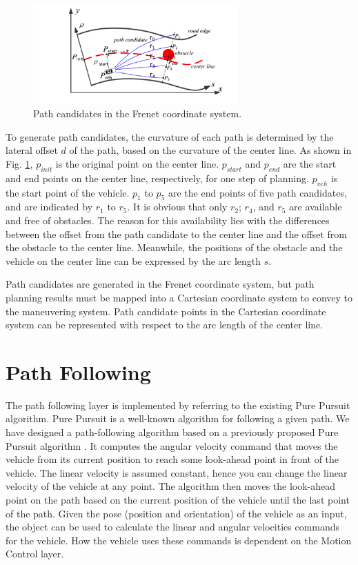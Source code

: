 \begin{figure}[h]
\centering
\includegraphics[width=0.7\textwidth]{figs/ch3/path_selection}
\caption{Path candidates in the Frenet coordinate system.}
\label{fig:path_select}
\end{figure}

To generate path candidates, the curvature of each path is determined by the lateral offset $d$ of the path, based on the curvature of the center line. As shown in Fig. \ref{fig:path_select}, $p_{init}$ is the original point on the center line. $p_{start}$ and $p_{end}$ are the start and end points on the center line, respectively, for one step of planning. $p_{veh}$ is the start point of the vehicle. $p_1$ to $p_5$ are the end points of five path candidates, and are indicated by $r_1$ to $r_5$. It is obvious that only $r_2$; $r_4$, and $r_5$ are available and free of obstacles. The reason for this availability lies with the differences between the offset from the path candidate to the center line and the offset from the obstacle to the center line. Meanwhile, the positions of the obstacle and the vehicle on the center line can be expressed by the arc length $s$.

Path candidates are generated in the Frenet coordinate system, but path planning results must be mapped into a Cartesian coordinate system to convey to the maneuvering system. Path candidate points in the Cartesian coordinate system can be represented with respect to the arc length of the center line.

\section{Path Following}

The path following layer is implemented by referring to the existing Pure Pursuit algorithm. Pure Pursuit is a well-known algorithm for following a given path. We have designed a path-following algorithm based on a previously proposed Pure Pursuit algorithm \cite{PurePursuit1992}. It computes the angular velocity command that moves the vehicle from its current position to reach some look-ahead point in front of the vehicle. The linear velocity is assumed constant, hence you can change the linear velocity of the vehicle at any point. The algorithm then moves the look-ahead point on the path based on the current position of the vehicle until the last point of the path. Given the pose (position and orientation) of the vehicle as an input, the object can be used to calculate the linear and angular velocities commands for the vehicle. How the vehicle uses these commands is dependent on the Motion Control layer.

